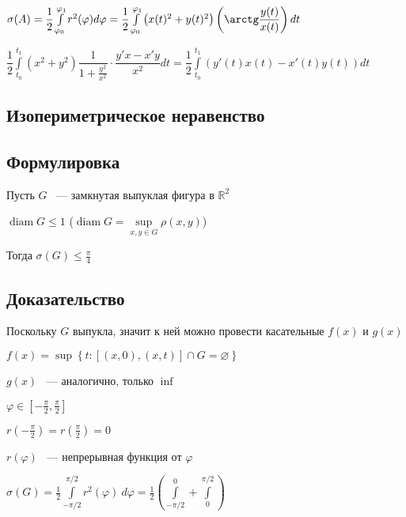 \documentclass[../main.tex]{subfiles}
\begin{document}
            $\sigma (A) = \dfrac{1}{2} \int\limits^{\varphi_1}_{\varphi_0} r^2(\varphi) d \varphi = \dfrac{1}{2} \int\limits^{\varphi_1}_{\varphi_0} \left(x(t)^2 + y(t)^2 \right) \left( \arctg \dfrac{y(t)}{x(t)} \right) dt$
            
            $\dfrac{1}{2} \int\limits^{t_1}_{t_0} (x^2 + y^2) \dfrac{1}{1 + \frac{y^2}{x^2}} \cdot \dfrac{y'x - x'y}{x^2} dt = \dfrac{1}{2} \int\limits^{t_1}_{t_0} \left( y'(t) x(t) - x'(t) y(t) \right) dt$
            
\newpage


\subsection{Изопериметрическое неравенство}
 \subsection*{Формулировка}
        
            Пусть $G$ ~--- замкнутая выпуклая фигура в $\mathbb{R}^2$
            
            $\operatorname{diam} G \leq 1$ ($\operatorname{diam} G = \sup\limits_{x, y \in G} \rho(x, y)$)
            
            Тогда $\sigma(G) \leq \frac{\pi}{4}$
            
        \subsection*{Доказательство}
        
            Поскольку $G$ выпукла, значит к ней можно провести касательные $f(x)$ и $g(x)$
            
            $f(x) = \sup \left\{ t : [(x, 0), (x, t)] \cap G = \varnothing \right\}$
            
            $g(x)$ ~--- аналогично, только $\inf$
            
            $\varphi \in \left[ -\frac{\pi}{2}, \frac{\pi}{2} \right]$
            
            $r(-\frac{\pi}{2}) = r(\frac{\pi}{2}) = 0$
            
            $r(\varphi)$ ~--- непрерывная функция от $\varphi$
            
            $\sigma(G) = \frac{1}{2} \int\limits^{\pi / 2}_{-\pi / 2} r^2 (\varphi) \ d \varphi = \frac{1}{2} \left( \int\limits^0_{-\pi / 2} + \int\limits^{\pi / 2}_0 \right)$
            
\end{document}
